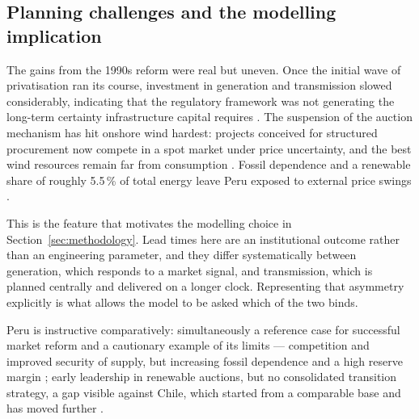 \subsection{Planning challenges and the modelling implication}
\label{sec:peru:delays}

The gains from the 1990s reform were real but uneven. Once the initial wave of
privatisation ran its course, investment in generation and transmission slowed
considerably, indicating that the regulatory framework was not generating the
long-term certainty infrastructure capital requires \citep{rudnick2019}. The
suspension of the auction mechanism has hit onshore wind hardest: projects conceived
for structured procurement now compete in a spot market under price uncertainty,
and the best wind resources remain far from consumption \citep{torres2026}. Fossil
dependence and a renewable share of roughly 5.5\,\% of total energy leave Peru
exposed to external price swings \citep{colinacalvo2024}.

This is the feature that motivates the modelling choice in
Section~\ref{sec:methodology}. Lead times here are an institutional outcome rather
than an engineering parameter, and they differ systematically between generation,
which responds to a market signal, and transmission, which is planned centrally and
delivered on a longer clock. Representing that asymmetry explicitly is what allows
the model to be asked which of the two binds.

Peru is instructive comparatively: simultaneously a reference case for successful
market reform and a cautionary example of its limits --- competition and improved
security of supply, but increasing fossil dependence and a high reserve margin
\citep{rudnick2019}; early leadership in renewable auctions, but no consolidated
transition strategy, a gap visible against Chile, which started from a comparable base
and has moved further \citep{reyes2025,guliev2022}.
